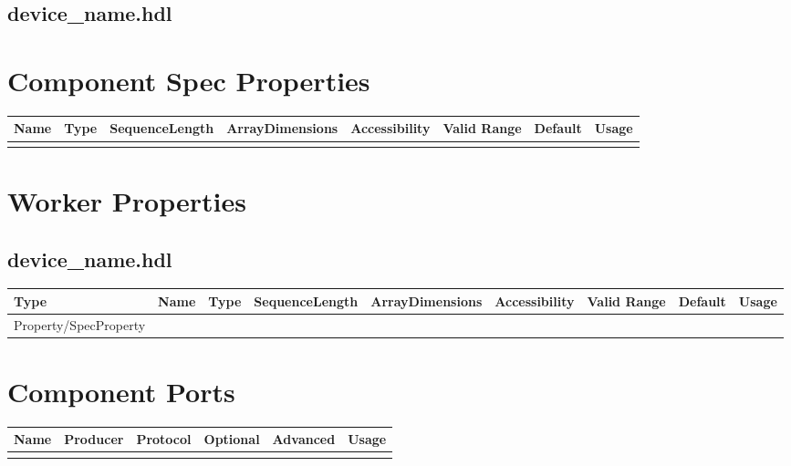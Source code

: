 \documentclass{article}
\def\comp{device\_name}
\begin{document}
\subsection*{\comp.hdl}

\begin{landscape}
	\section*{Component Spec Properties}
	\begin{scriptsize}
		\begin{tabular}{|p{3cm}|p{1.5cm}|c|c|c|c|c|p{7cm}|}
			\hline
			\rowcolor{blue}
			Name & Type & SequenceLength & ArrayDimensions & Accessibility & Valid Range & Default & Usage \\
			\hline
			     &      &                &                 &               &             &         &       \\
			\hline
		\end{tabular}
	\end{scriptsize}

	\section*{Worker Properties}
	\subsection*{\comp.hdl}
	\begin{scriptsize}
		\begin{tabular}{|p{3cm}|p{2cm}|p{1cm}|c|c|c|c|c|p{5cm}|}
			\hline
			\rowcolor{blue}
			Type & Name & Type & SequenceLength & ArrayDimensions & Accessibility & Valid Range & Default & Usage \\
			\hline
			Property/SpecProperty & & & & & & &\\
			\hline
		\end{tabular}
	\end{scriptsize}

	\section*{Component Ports}
	\begin{scriptsize}
		\begin{tabular}{|M{2cm}|M{1.5cm}|M{4cm}|c|c|M{9cm}|}
			\hline
			\rowcolor{blue}
			Name & Producer & Protocol & Optional & Advanced & Usage \\
			\hline
			& & & &\\
			\hline
		\end{tabular}
	\end{scriptsize}


\end{landscape}
\end{document}
